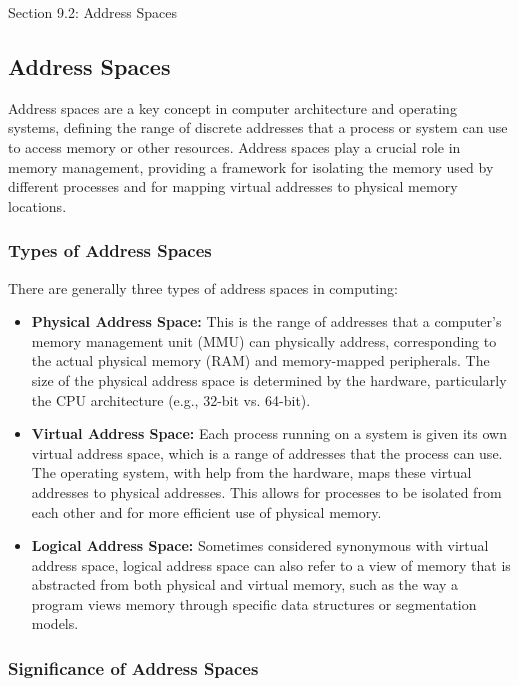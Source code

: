 \begin{notes}{Section 9.2: Address Spaces}
    \subsection*{Address Spaces}

    Address spaces are a key concept in computer architecture and operating systems, defining the range of discrete addresses that a process or system can use to access memory or other resources. 
    Address spaces play a crucial role in memory management, providing a framework for isolating the memory used by different processes and for mapping virtual addresses to physical memory locations. \vspace*{1em}
    
    \subsubsection*{Types of Address Spaces}
    
    There are generally three types of address spaces in computing:
    
    \begin{itemize}
        \item \textbf{Physical Address Space:} This is the range of addresses that a computer's memory management unit (MMU) can physically address, corresponding to the actual physical memory (RAM) 
        and memory-mapped peripherals. The size of the physical address space is determined by the hardware, particularly the CPU architecture (e.g., 32-bit vs. 64-bit).
        \item \textbf{Virtual Address Space:} Each process running on a system is given its own virtual address space, which is a range of addresses that the process can use. The operating system, 
        with help from the hardware, maps these virtual addresses to physical addresses. This allows for processes to be isolated from each other and for more efficient use of physical memory.
        \item \textbf{Logical Address Space:} Sometimes considered synonymous with virtual address space, logical address space can also refer to a view of memory that is abstracted from both 
        physical and virtual memory, such as the way a program views memory through specific data structures or segmentation models.
    \end{itemize}
    
    \subsubsection*{Significance of Address Spaces}
    

\end{notes}
